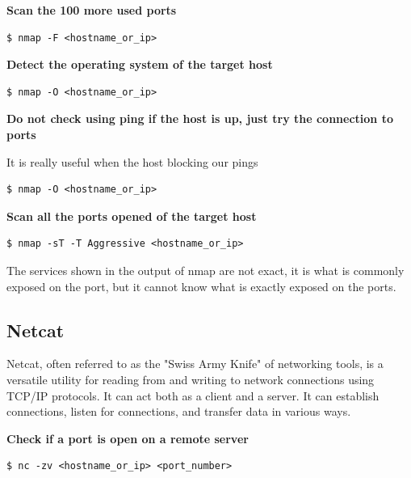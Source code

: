 \documentclass{article}
\newenvironment{blocktemplateII}[1]{%
    \tcolorbox[beamer,%
    noparskip,breakable,
    colframe=Green,%
    colbacklower=LimeGreen!75!LightGreen,%
    title=#1]}%
    {\endtcolorbox}
\newenvironment{codetemplate}[1][]{%
  \mybasecolorbox[#1]
  \itshape
}{%
  \endmybasecolorbox
}
\begin{document}
\textbf{Scan the 100 more used ports}
\begin{codetemplate}{}
\begin{verbatim}
$ nmap -F <hostname_or_ip>
\end{verbatim}
\end{codetemplate}

\textbf{Detect the operating system of the target host}
\begin{codetemplate}{}
\begin{verbatim}
$ nmap -O <hostname_or_ip>
\end{verbatim}
\end{codetemplate}

\textbf{Do not check using ping if the host is up, just try the connection to ports}

It is really useful when the host blocking our pings
\begin{codetemplate}{}
\begin{verbatim}
$ nmap -O <hostname_or_ip>
\end{verbatim}
\end{codetemplate}

\textbf{Scan all the ports opened of the target host}
\begin{codetemplate}{}
\begin{verbatim}
$ nmap -sT -T Aggressive <hostname_or_ip>
\end{verbatim}
\end{codetemplate}

\begin{blocktemplateII}{NOTE}
The services shown in the output of nmap are not exact, it is what is commonly exposed on the port, but it cannot know what is exactly exposed on the ports.
\end{blocktemplateII}

\subsection{Netcat}

Netcat, often referred to as the "Swiss Army Knife" of networking tools, is a versatile utility for reading from and writing to network connections using TCP/IP protocols. It can act both as a client and a server. It can establish connections, listen for connections, and transfer data in various ways.

\textbf{Check if a port is open on a remote server}
\begin{codetemplate}
\begin{verbatim}
$ nc -zv <hostname_or_ip> <port_number>
\end{verbatim}
\end{codetemplate}
\end{document}
